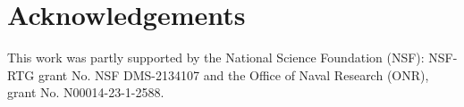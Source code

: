 \documentclass{article}
\theoremstyle{plain}
\theoremstyle{definition}
\theoremstyle{remark}
\begin{document}

\section*{Acknowledgements}
This work was partly supported by the National Science Foundation (NSF): NSF-RTG grant No. NSF DMS-2134107 and the Office of Naval Research (ONR), grant No. N00014-23-1-2588.

\nocite{langley00}
\end{document}
